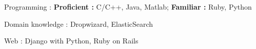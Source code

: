 


\begin{cvskills}


\cvskill
	{Programming : } 
	{\textbf{Proficient :}  C/C++, Java, Matlab; 
	\textbf{Familiar :} Ruby, Python} 

\cvskill
	{Domain knowledge : }
	{Dropwizard, ElasticSearch}


\cvskill
{Web : } %
{Django with Python, Ruby on Rails}

\end{cvskills}
